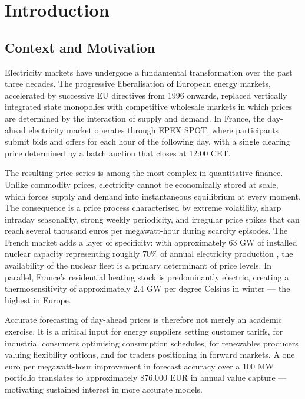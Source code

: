 \chapter{Introduction}
\label{chap:intro}

\section{Context and Motivation}

Electricity markets have undergone a fundamental transformation over the past three decades. The progressive liberalisation of European energy markets, accelerated by successive EU directives from 1996 onwards, replaced vertically integrated state monopolies with competitive wholesale markets in which prices are determined by the interaction of supply and demand. In France, the day-ahead electricity market operates through EPEX SPOT, where participants submit bids and offers for each hour of the following day, with a single clearing price determined by a batch auction that closes at 12:00 CET.

The resulting price series is among the most complex in quantitative finance. Unlike commodity prices, electricity cannot be economically stored at scale, which forces supply and demand into instantaneous equilibrium at every moment. The consequence is a price process characterised by extreme volatility, sharp intraday seasonality, strong weekly periodicity, and irregular price spikes that can reach several thousand euros per megawatt-hour during scarcity episodes. The French market adds a layer of specificity: with approximately 63 GW of installed nuclear capacity representing roughly 70\% of annual electricity production \citep{rte2023}, the availability of the nuclear fleet is a primary determinant of price levels. In parallel, France's residential heating stock is predominantly electric, creating a thermosensitivity of approximately 2.4 GW per degree Celsius in winter \citep{rte2023} — the highest in Europe.

Accurate forecasting of day-ahead prices is therefore not merely an academic exercise. It is a critical input for energy suppliers setting customer tariffs, for industrial consumers optimising consumption schedules, for renewables producers valuing flexibility options, and for traders positioning in forward markets. A one euro per megawatt-hour improvement in forecast accuracy over a 100 MW portfolio translates to approximately 876,000 EUR in annual value capture — motivating sustained interest in more accurate models.

